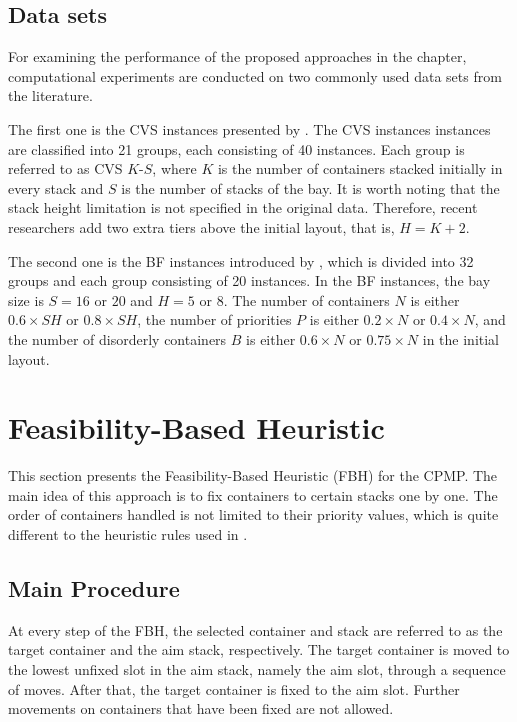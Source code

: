\documentclass{article}
\begin{document}
\subsection{Data sets}

For examining the performance of the proposed approaches in the chapter, computational experiments are conducted on two commonly used data sets from the literature.

The first one is the CVS instances presented by \cite{Caserta2011}. The CVS instances instances are classified into 21 groups, each consisting of 40 instances. Each group is referred to as CVS $K$-$S$, where $K$ is the number of containers stacked initially in every stack and $S$ is the number of stacks of the bay. It is worth noting that the stack height limitation is not specified in the original data. Therefore, recent researchers add two extra tiers above the initial layout, that is, $H=K+2$.

The second one is the BF instances introduced by \cite{Bortfeldt2012CPMP}, which is divided into 32 groups and each group consisting of 20 instances. In the BF instances, the bay size is $S=16$ or $20$ and $H=5$ or $8$. The number of containers $N$ is either $0.6\times SH$ or $0.8\times SH$, the number of priorities $P$ is either $0.2\times N$ or $0.4\times N$, and the number of disorderly containers  $B$ is either $0.6\times N$ or $0.75\times N$ in the initial layout.



\section{Feasibility-Based Heuristic}
\label{cpmp:sec:fbh}


This section presents the Feasibility-Based Heuristic (FBH) for the CPMP\@. The main idea of this approach is to fix containers to certain stacks one by one. The order of containers handled is not limited to their priority values, which is quite different to the heuristic rules used in \citep{ExpositoIzquierdo20128337,Wang201567}.


\subsection{Main Procedure}

At every step of the FBH, the selected container and stack are referred to as the target container and the aim stack, respectively. The target container is moved to the lowest unfixed slot in the aim stack, namely the aim slot, through a sequence of moves. After that, the target container is fixed to the aim slot. Further movements on containers that have been fixed are not allowed.
\end{document}
